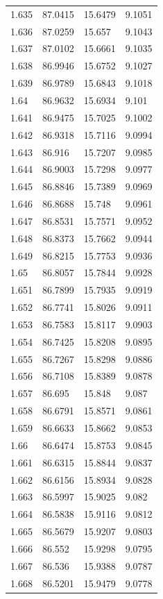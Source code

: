 \begin{tabular}{llll}
1.635 & 87.0415 & 15.6479 & 9.1051 \\
1.636 & 87.0259 & 15.657 & 9.1043 \\
1.637 & 87.0102 & 15.6661 & 9.1035 \\
1.638 & 86.9946 & 15.6752 & 9.1027 \\
1.639 & 86.9789 & 15.6843 & 9.1018 \\
1.64 & 86.9632 & 15.6934 & 9.101 \\
1.641 & 86.9475 & 15.7025 & 9.1002 \\
1.642 & 86.9318 & 15.7116 & 9.0994 \\
1.643 & 86.916 & 15.7207 & 9.0985 \\
1.644 & 86.9003 & 15.7298 & 9.0977 \\
1.645 & 86.8846 & 15.7389 & 9.0969 \\
1.646 & 86.8688 & 15.748 & 9.0961 \\
1.647 & 86.8531 & 15.7571 & 9.0952 \\
1.648 & 86.8373 & 15.7662 & 9.0944 \\
1.649 & 86.8215 & 15.7753 & 9.0936 \\
1.65 & 86.8057 & 15.7844 & 9.0928 \\
1.651 & 86.7899 & 15.7935 & 9.0919 \\
1.652 & 86.7741 & 15.8026 & 9.0911 \\
1.653 & 86.7583 & 15.8117 & 9.0903 \\
1.654 & 86.7425 & 15.8208 & 9.0895 \\
1.655 & 86.7267 & 15.8298 & 9.0886 \\
1.656 & 86.7108 & 15.8389 & 9.0878 \\
1.657 & 86.695 & 15.848 & 9.087 \\
1.658 & 86.6791 & 15.8571 & 9.0861 \\
1.659 & 86.6633 & 15.8662 & 9.0853 \\
1.66 & 86.6474 & 15.8753 & 9.0845 \\
1.661 & 86.6315 & 15.8844 & 9.0837 \\
1.662 & 86.6156 & 15.8934 & 9.0828 \\
1.663 & 86.5997 & 15.9025 & 9.082 \\
1.664 & 86.5838 & 15.9116 & 9.0812 \\
1.665 & 86.5679 & 15.9207 & 9.0803 \\
1.666 & 86.552 & 15.9298 & 9.0795 \\
1.667 & 86.536 & 15.9388 & 9.0787 \\
1.668 & 86.5201 & 15.9479 & 9.0778 \\

\end{tabular}
